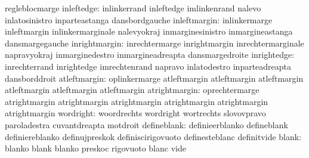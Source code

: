                                   regleblocmarge
                      inleftedge: inlinkerrand                     inleftedge
                                  imlinkenrand                     nalevo
                                  inlatosinistro                   inparteastanga
                                  dansbordgauche
                    inleftmargin: inlinkermarge                    inleftmargin
                                  inlinkermarginale                nalevyokraj
                                  inmarginesinistro                inmargineastanga
                                  dansmargegauche
                   inrightmargin: inrechtermarge                   inrightmargin
                                  inrechtermarginale               napravyokraj
                                  inmarginedestro                  inmargineadreapta
                                  dansmargedroite
                     inrightedge: inrechterrand                    inrightedge
                                  imrechtenrand                    napravo
                                  inlatodestro                     inparteadreapta
                                  dansborddroit
                    atleftmargin: oplinkermarge                    atleftmargin
                                  atleftmargin                     atleftmargin
                                  atleftmargin                     atleftmargin
                                  atleftmargin
                   atrightmargin: oprechtermarge                   atrightmargin
                                  atrightmargin                    atrightmargin
                                  atrightmargin                    atrightmargin
                                  atrightmargin
                       wordright: woordrechts                      wordright
                                  wortrechts                       slovovpravo
                                  paroladestra                     cuvantdreapta
                                  motdroit
                     defineblank: definieerblanko                  defineblank
                                  definiereblanko                  definujpreskok
                                  definiscirigovuoto               definesteblanc
                                  definitvide
                           blank: blanko                           blank
                                  blanko                           preskoc
                                  rigovuoto                        blanc
                                  vide
